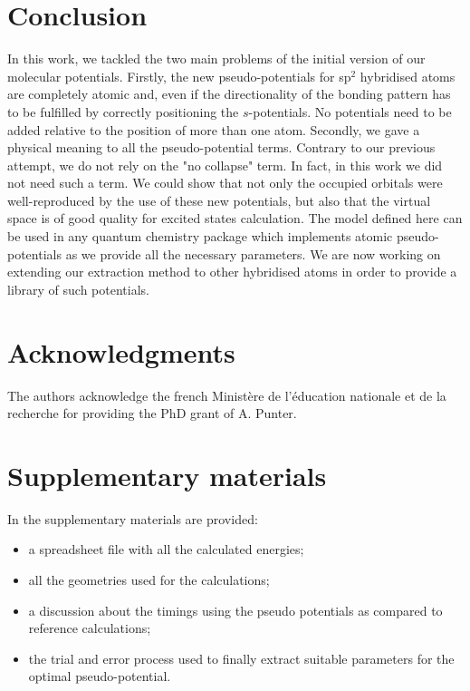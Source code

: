 \documentclass[aip]{revtex4-1}
\begin{document}
\section{Conclusion}
In this work, we tackled the two main problems of the initial version of our
molecular potentials.
Firstly, the new pseudo-potentials for sp$^2$ hybridised
atoms are completely atomic and, even if the directionality of the bonding pattern
has to be fulfilled by correctly positioning the \(s\)-potentials. No potentials need to
be added relative to the position of more than one atom.
Secondly, we gave a physical meaning to all the pseudo-potential
terms.
Contrary to our previous attempt, we do not rely on the "no collapse" term.
In fact, in this work we did not need such a term.
We could show that not only the occupied orbitals were well-reproduced
by the use of these new potentials, but also that the virtual space is of good quality
for excited states calculation.
The model defined here can be used in any quantum chemistry package which
implements atomic pseudo-potentials as we provide all the necessary parameters.
We are now working on extending our extraction method to other hybridised atoms
in order to provide a library of such potentials.

\section{Acknowledgments}
The authors acknowledge the french Minist\`ere de l'\'education
nationale et de la recherche for providing the PhD grant of A. Punter.

\section{Supplementary materials}
In the supplementary materials are provided:
\begin{itemize}
\item a spreadsheet file with all the calculated energies;
\item all the geometries used for the calculations;
\item a discussion about the timings using the pseudo potentials as compared to reference
calculations;
\item the trial and error process used to finally extract suitable parameters for
the optimal pseudo-potential.
\end{itemize}
\end{document}
